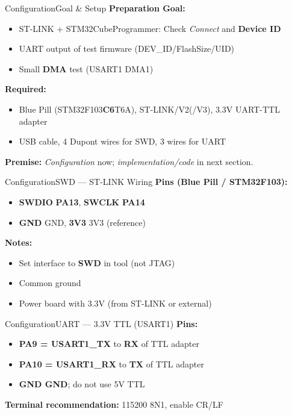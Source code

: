 \documentclass{beamer}
\begin{document}
\begin{frame}{Configuration}{Goal \& Setup}
	\textbf{Preparation Goal:}
	\begin{itemize}
		\item ST-LINK + STM32CubeProgrammer: Check \textit{Connect} and \textbf{Device ID}
		\item UART output of test firmware (DEV\_ID/FlashSize/UID)
		\item Small \textbf{DMA} test (USART1 \textrightarrow{} DMA1)
	\end{itemize}
	
	\medskip
	\textbf{Required:}
	\begin{itemize}
		\item Blue Pill (STM32F103\textbf{C6}T6A), ST-LINK/V2(/V3), 3.3V UART-TTL adapter
		\item USB cable, 4 Dupont wires for SWD, 3 wires for UART
	\end{itemize}
	
	\medskip
	\textbf{Premise:} \textit{Configuration} now; \textit{implementation/code} in next section.
\end{frame}
\begin{frame}{Configuration}{SWD — ST-LINK Wiring}
	\textbf{Pins (Blue Pill / STM32F103):}
	\begin{itemize}
		\item \textbf{SWDIO} \textrightarrow{} \textbf{PA13}, \textbf{SWCLK} \textrightarrow{} \textbf{PA14}
		\item \textbf{GND} \textrightarrow{} GND, \textbf{3V3} \textrightarrow{} 3V3 (reference)
	\end{itemize}
	
	\medskip
	\textbf{Notes:}
	\begin{itemize}
		\item Set interface to \textbf{SWD} in tool (not JTAG)
		\item Common ground
		\item Power board with 3.3V (from ST-LINK or external)
	\end{itemize}
\end{frame}

\begin{frame}{Configuration}{UART — 3.3V TTL (USART1)}
	\textbf{Pins:}
	\begin{itemize}
		\item \textbf{PA9 = USART1\_TX} \textrightarrow{} to \textbf{RX} of TTL adapter
		\item \textbf{PA10 = USART1\_RX} \textrightarrow{} to \textbf{TX} of TTL adapter
		\item \textbf{GND \textrightarrow{} GND}; do not use 5V TTL
	\end{itemize}
	
	\medskip
	\textbf{Terminal recommendation:} 115200 8N1, enable CR/LF
\end{frame}
\end{document}
